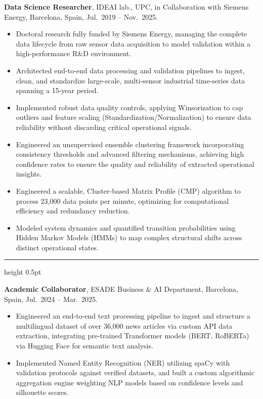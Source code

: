 \documentclass[11pt,a4paper]{article}
\begin{document}
\textbf{Data Science Researcher}, IDEAI lab., UPC, in Collaboration with Siemens Energy, Barcelona, Spain, Jul.~2019 -- Nov.~2025.
\begin{itemize}[leftmargin=*, nosep, topsep=2pt]
    \item Doctoral research fully funded by Siemens Energy, managing the complete data lifecycle from raw sensor data acquisition to model validation within a high-performance R\&D environment.
    \item Architected end-to-end data processing and validation pipelines to ingest, clean, and standardize large-scale, multi-sensor industrial time-series data spanning a 15-year period.
    \item Implemented robust data quality controls, applying Winsorization to cap outliers and feature scaling (Standardization/Normalization) to ensure data reliability without discarding critical operational signals.
    \item Engineered an unsupervised ensemble clustering framework incorporating consistency thresholds and advanced filtering mechanisms, achieving high confidence rates to ensure the quality and reliability of extracted operational insights.
    \item Engineered a scalable, Cluster-based Matrix Profile (CMP) algorithm to process 23,000 data points per minute, optimizing for computational efficiency and redundancy reduction.
    \item Modeled system dynamics and quantified transition probabilities using Hidden Markov Models (HMMs) to map complex structural shifts across distinct operational states.
\end{itemize}

\vspace{3mm}
{\color{gray!75}\hrule height 0.5pt}
\vspace{2mm}

\textbf{Academic Collaborator}, ESADE Business \& AI Department, Barcelona, Spain, Jul.~2024 -- Mar.~2025.
\begin{itemize}[leftmargin=*, nosep, topsep=2pt]
    \item Engineered an end-to-end text processing pipeline to ingest and structure a multilingual dataset of over 36,000 news articles via custom API data extraction, integrating pre-trained Transformer models (BERT, RoBERTa) via Hugging Face for semantic text analysis.
    \item Implemented Named Entity Recognition (NER) utilizing spaCy with validation protocols against verified datasets, and built a custom algorithmic aggregation engine weighting NLP models based on confidence levels and silhouette scores.
\end{itemize}
\end{document}
